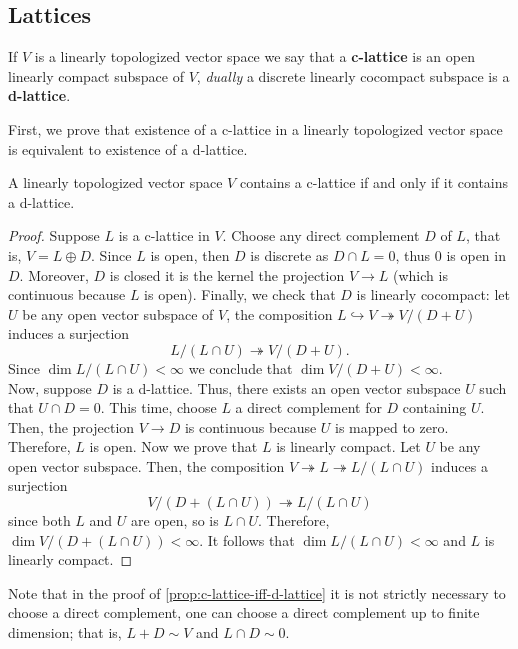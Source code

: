 \subsection*{Lattices}
\begin{definition}\label{def:c-lattice}
	If $V$ is a linearly topologized vector space we say that a \textbf{c-lattice} is an open linearly compact subspace of $V$, \textit{dually} a discrete linearly cocompact subspace is a \textbf{d-lattice}.
\end{definition}
First, we prove that existence of a c-lattice in a linearly topologized vector space is equivalent to existence of a d-lattice.
\begin{proposition}\label{prop:c-lattice-iff-d-lattice}
	A linearly topologized vector space $V$ contains a c-lattice if and only if it contains a d-lattice. 
\end{proposition}
\begin{proof}
	Suppose $L$ is a c-lattice in $V$. Choose any direct complement $D$ of $L$, that is, $V = L \oplus D$. Since $L$ is open, then $D$ is discrete as $D\cap L = 0$, thus ${0}$ is open in $D$. Moreover, $D$ is closed it is the kernel the projection $V \to L$ (which is continuous because $L$ is open). Finally, we check that $D$ is linearly cocompact: let $U$ be any open vector subspace of $V$, the composition $L \hookrightarrow V \twoheadrightarrow V/(D+U)$ induces a surjection 
	\[
		L/(L \cap U) \twoheadrightarrow V/(D+U).
	\]
	Since $\dim L / (L \cap U) < \infty$ we conclude that $\dim V/(D+U) < \infty$. \\
	Now, suppose $D$ is a d-lattice. Thus, there exists an open vector subspace $U$ such that $U \cap D = 0$. This time, choose $L$ a direct complement for $D$ containing $U$. Then, the projection $V \to D$ is continuous because $U$ is mapped to zero. Therefore, $L$ is open. Now we prove that $L$ is linearly compact. Let $U$ be any open vector subspace. Then, the composition $V \twoheadrightarrow L \twoheadrightarrow L/(L \cap U)$ induces a surjection
	 \[
	 	V/(D + (L \cap U)) \twoheadrightarrow L/(L \cap U)
	 \]
	 since both $L$ and $U$ are open, so is $L\cap U$. Therefore, $\dim V/(D + (L \cap U)) < \infty$. It follows that $\dim L/(L \cap U) < \infty$ and $L$ is linearly compact.  
\end{proof}
\begin{remark}\label{up-to-finite-dimension}
	Note that in the proof of \cref{prop:c-lattice-iff-d-lattice} it is not strictly necessary to choose a direct complement, one can choose a direct complement up to finite dimension; that is, $L + D \sim V$ and $L \cap D \sim 0$. 
\end{remark}
